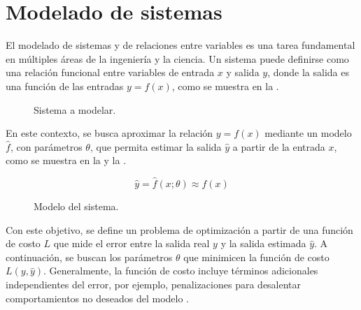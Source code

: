\section{Modelado de sistemas}
\label{sec:modelado_de_sistemas}

El modelado de sistemas y de relaciones entre variables es una tarea fundamental en múltiples áreas de la ingeniería y la ciencia. Un sistema puede definirse como una relación funcional entre variables de entrada $x$ y salida $y$, donde la salida es una función de las entradas $y = f(x)$, como se muestra en la .

\begin{figure}[H]
    \centering
    \caption{Sistema a modelar.}
    \label{fig:system}
\end{figure}

En este contexto, se busca aproximar la relación $y = f(x)$ mediante un modelo $\hat{f}$, con parámetros $\theta$, que permita estimar la salida $\hat{y}$ a partir de la entrada $x$, como se muestra en la  y la .

\begin{equation}
    \label{eq:system_approximation}
    \hat{y} = \hat{f}(x; \theta) \approx f(x)
\end{equation}

\begin{figure}[H]
    \centering
    \caption{Modelo del sistema.}
    \label{fig:system_model}
\end{figure}

Con este objetivo, se define un problema de optimización a partir de una función de costo $L$ que mide el error entre la salida real $y$ y la salida estimada $\hat{y}$. A continuación, se buscan los parámetros $\theta$ que minimicen la función de costo $L(y, \hat{y})$. Generalmente, la función de costo incluye términos adicionales independientes del error, por ejemplo, penalizaciones para desalentar comportamientos no deseados del modelo \cite{Ng2004}.

